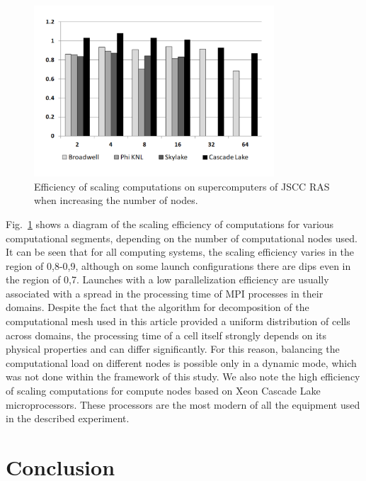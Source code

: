 \documentclass[
11pt,%
tightenlines,%
twoside,%
onecolumn,%
nofloats,%
nobibnotes,%
nofootinbib,%
superscriptaddress,%
noshowpacs,%
centertags]%
{revtex4}
\begin{document}
\begin{figure}[h]
\includegraphics[width=0.8\textwidth]{pics/scaling.pdf}
\caption{Efficiency of scaling computations on supercomputers of JSCC RAS when increasing the number of nodes.}\label{fig:speedup}
\end{figure}

Fig.~\ref{fig:speedup} shows a diagram of the scaling efficiency of computations for various computational segments, depending on the number of computational nodes used.
It can be seen that for all computing systems, the scaling efficiency varies in the region of 0,8-0,9, although on some launch configurations there are dips even in the region of 0,7.
Launches with a low parallelization efficiency are usually associated with a spread in the processing time of MPI processes in their domains.
Despite the fact that the algorithm for decomposition of the computational mesh used in this article provided a uniform distribution of cells across domains, the processing time of a cell itself strongly depends on its physical properties and can differ significantly.
For this reason, balancing the computational load on different nodes is possible only in a dynamic mode, which was not done within the framework of this study.
We also note the high efficiency of scaling computations for compute nodes based on Xeon Cascade Lake microprocessors.
These processors are the most modern of all the equipment used in the described experiment.

\section{Conclusion}
\end{document}
